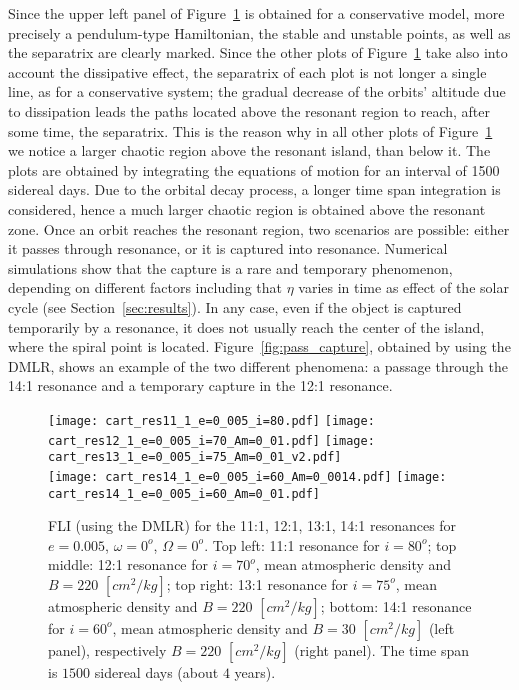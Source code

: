 \documentclass[12pt,reqno]{amsart}
\numberwithin{equation}{section}
\begin{document}
Since the upper left panel of Figure~\ref{fig:cartography} is obtained for a conservative model,
more precisely a pendulum-type Hamiltonian, the stable and unstable points,
as well as the separatrix are clearly marked. Since the other plots of Figure~\ref{fig:cartography}
take also into account the dissipative effect, the separatrix of each plot
is not longer a single line, as for a conservative system;
the gradual decrease of the orbits' altitude due to dissipation leads the paths located above
the resonant region to reach, after some time, the separatrix. This is the reason why in
all other plots of Figure~\ref{fig:cartography} we notice a larger chaotic region above the resonant island,
than below it. The plots are obtained by integrating the equations of motion for an interval of 1500 sidereal days.
Due to the orbital decay process, a longer time span integration is considered, hence a much larger
chaotic region is obtained above the resonant zone. Once an orbit reaches
the resonant region, two scenarios are possible: either it passes through resonance, or
it is captured into resonance.
Numerical simulations show that the capture is a rare and temporary phenomenon, depending on
different factors including that $\eta$ varies in time as effect of the solar cycle (see Section~\ref{sec:results}).
In any case, even if  the object is captured temporarily by a resonance,
it does not usually reach the center of the island, where the  spiral point is located.
Figure~\ref{fig:pass_capture}, obtained by using the DMLR, shows an example of the two different phenomena:
a passage through the 14:1 resonance and a temporary capture in the 12:1 resonance.



\begin{figure}[h]
\centering {} 
\texttt{[image: cart\_res11\_1\_e=0\_005\_i=80.pdf]}
\texttt{[image: cart\_res12\_1\_e=0\_005\_i=70\_Am=0\_01.pdf]}
\texttt{[image: cart\_res13\_1\_e=0\_005\_i=75\_Am=0\_01\_v2.pdf]}\\
\vglue-0.6cm
\texttt{[image: cart\_res14\_1\_e=0\_005\_i=60\_Am=0\_0014.pdf]}
\texttt{[image: cart\_res14\_1\_e=0\_005\_i=60\_Am=0\_01.pdf]}
\caption{FLI (using the DMLR) for the 11:1, 12:1, 13:1, 14:1 resonances for $e=0.005$, $\omega=0^o$, $\Omega=0^o$.
Top left: 11:1 resonance for $i=80^o$; top middle: 12:1 resonance for $i=70^o$, mean atmospheric density and
$B=220$ $[cm^2/kg]$; top right: 13:1 resonance for $i=75^o$, mean atmospheric density and $B=220$ $[cm^2/kg]$;
bottom: 14:1 resonance for $i=60^o$, mean atmospheric density and $B=30$ $[cm^2/kg]$ (left panel),
respectively  $B=220$ $[cm^2/kg]$  (right panel). The time span is $1500$ sidereal days
(about $4$ years).} \label{fig:cartography}
\end{figure}
\end{document}
